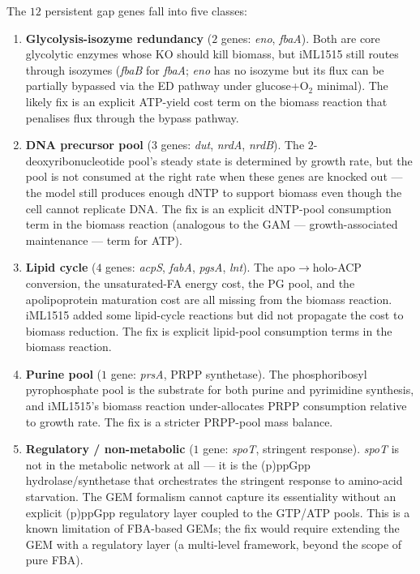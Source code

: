 \documentclass[11pt,a4paper]{article}
\theoremstyle{plain}
\theoremstyle{definition}
\theoremstyle{remark}
\begin{document}
The $12$ persistent gap genes fall into five classes:

\begin{enumerate}
\item \textbf{Glycolysis-isozyme redundancy} ($2$ genes: \emph{eno},
\emph{fbaA}). Both are core glycolytic enzymes whose KO should kill
biomass, but iML1515 still routes through isozymes (\emph{fbaB} for
\emph{fbaA}; \emph{eno} has no isozyme but its flux can be partially
bypassed via the ED pathway under glucose+O$_2$ minimal). The likely
fix is an explicit ATP-yield cost term on the biomass reaction that
penalises flux through the bypass pathway.

\item \textbf{DNA precursor pool} ($3$ genes: \emph{dut}, \emph{nrdA},
\emph{nrdB}). The $2$-deoxyribonucleotide pool's steady state is
determined by growth rate, but the pool is not consumed at the right
rate when these genes are knocked out --- the model still produces
enough dNTP to support biomass even though the cell cannot replicate
DNA. The fix is an explicit dNTP-pool consumption term in the biomass
reaction (analogous to the GAM --- growth-associated maintenance ---
term for ATP).

\item \textbf{Lipid cycle} ($4$ genes: \emph{acpS}, \emph{fabA},
\emph{pgsA}, \emph{lnt}). The apo$\to$holo-ACP conversion, the
unsaturated-FA energy cost, the PG pool, and the apolipoprotein
maturation cost are all missing from the biomass reaction. iML1515
added some lipid-cycle reactions but did not propagate the cost
to biomass reduction. The fix is explicit lipid-pool consumption
terms in the biomass reaction.

\item \textbf{Purine pool} ($1$ gene: \emph{prsA}, PRPP synthetase).
The phosphoribosyl pyrophosphate pool is the substrate for both
purine and pyrimidine synthesis, and iML1515's biomass reaction
under-allocates PRPP consumption relative to growth rate. The fix
is a stricter PRPP-pool mass balance.

\item \textbf{Regulatory / non-metabolic} ($1$ gene: \emph{spoT},
stringent response). \emph{spoT} is not in the metabolic network at
all --- it is the (p)ppGpp hydrolase/synthetase that orchestrates
the stringent response to amino-acid starvation. The GEM formalism
cannot capture its essentiality without an explicit (p)ppGpp
regulatory layer coupled to the GTP/ATP pools. This is a known
limitation of FBA-based GEMs; the fix would require extending the
GEM with a regulatory layer (a multi-level framework, beyond the
scope of pure FBA).


\end{enumerate}
\end{document}

